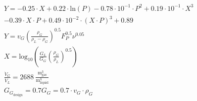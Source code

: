 \begin{refsection}[referencesCh6]

\begin{align}
	&Y =  - 0.25 \cdot X + 0.22 \cdot \text{ln}(P) - 0.78\cdot10^{-1} \cdot P^2 + 0.19\cdot10^{-1} \cdot X^3 \nonumber \\
	& - 0.39 \cdot X \cdot P + 0.49\cdot10^{-2} \cdot (X\cdot P)^3 + 0.89 \\
	&Y = v_G \left(\frac{\rho_G}{\rho_L-\rho_G}\right)^{0.5} F_{P}^{0.5} \nu^{0.05} \\
	&X = \text{log}_{10} \left(\frac{G_L}{G_G} \left(\frac{\rho_G}{\rho_L}\right)^{0.5}\right) \\
	&\frac{\dot{V}_G}{\dot{V}_L} = 2688 \ \frac{\text{m}^3_{\text{gas}}}{\text{m}^3_{\text{liquid}}} \label{eq:OpLine}
	\\
	& G_{G_{\text{design}}} = 0.7 G_G = 0.7 \cdot v_G \cdot \rho_G\label{eq:G_Design}
\end{align}


\end{refsection}

